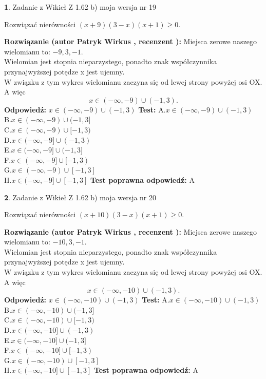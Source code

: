 \documentclass[12pt, a4paper]{article}
\theoremstyle{definition} %
\newtheorem{zad}{}
\newcommand{\zadStart}[1]{\begin{zad}#1\newline}
\newcommand{\zadStop}{\end{zad}}
\newcommand{\rozwStart}[2]{\noindent \textbf{Rozwiązanie (autor #1 , recenzent #2): }\newline}
\newcommand{\rozwStop}{\newline}
\newcommand{\odpStart}{\noindent \textbf{Odpowiedź:}\newline}
\newcommand{\odpStop}{\newline}
\newcommand{\testStart}{\noindent \textbf{Test:}\newline}
\newcommand{\testStop}{\newline}
\newcommand{\kluczStart}{\noindent \textbf{Test poprawna odpowiedź:}\newline}
\newcommand{\kluczStop}{\newline}
\begin{document}
\zadStart{Zadanie z Wikieł Z 1.62 b) moja wersja nr 19}

Rozwiązać nierówności $(x+9)(3-x)(x+1)\ge0$.
\zadStop
\rozwStart{Patryk Wirkus}{}
Miejsca zerowe naszego wielomianu to: $-9, 3, -1$.\\
Wielomian jest stopnia nieparzystego, ponadto znak współczynnika przy\linebreak najwyższej potędze x jest ujemny.\\ W związku z tym wykres wielomianu zaczyna się od lewej strony powyżej osi OX. A więc $$x \in (-\infty,-9) \cup (-1,3).$$
\rozwStop
\odpStart
$x \in (-\infty,-9) \cup (-1,3)$
\odpStop
\testStart
A.$x \in (-\infty,-9) \cup (-1,3)$\\
B.$x \in (-\infty,-9) \cup (-1,3]$\\
C.$x \in (-\infty,-9) \cup [-1,3)$\\
D.$x \in (-\infty,-9] \cup (-1,3)$\\
E.$x \in (-\infty,-9] \cup (-1,3]$\\
F.$x \in (-\infty,-9] \cup [-1,3)$\\
G.$x \in (-\infty,-9) \cup [-1,3]$\\
H.$x \in (-\infty,-9] \cup [-1,3]$
\testStop
\kluczStart
A
\kluczStop



\zadStart{Zadanie z Wikieł Z 1.62 b) moja wersja nr 20}

Rozwiązać nierówności $(x+10)(3-x)(x+1)\ge0$.
\zadStop
\rozwStart{Patryk Wirkus}{}
Miejsca zerowe naszego wielomianu to: $-10, 3, -1$.\\
Wielomian jest stopnia nieparzystego, ponadto znak współczynnika przy\linebreak najwyższej potędze x jest ujemny.\\ W związku z tym wykres wielomianu zaczyna się od lewej strony powyżej osi OX. A więc $$x \in (-\infty,-10) \cup (-1,3).$$
\rozwStop
\odpStart
$x \in (-\infty,-10) \cup (-1,3)$
\odpStop
\testStart
A.$x \in (-\infty,-10) \cup (-1,3)$\\
B.$x \in (-\infty,-10) \cup (-1,3]$\\
C.$x \in (-\infty,-10) \cup [-1,3)$\\
D.$x \in (-\infty,-10] \cup (-1,3)$\\
E.$x \in (-\infty,-10] \cup (-1,3]$\\
F.$x \in (-\infty,-10] \cup [-1,3)$\\
G.$x \in (-\infty,-10) \cup [-1,3]$\\
H.$x \in (-\infty,-10] \cup [-1,3]$
\testStop
\kluczStart
A
\kluczStop
\end{document}
